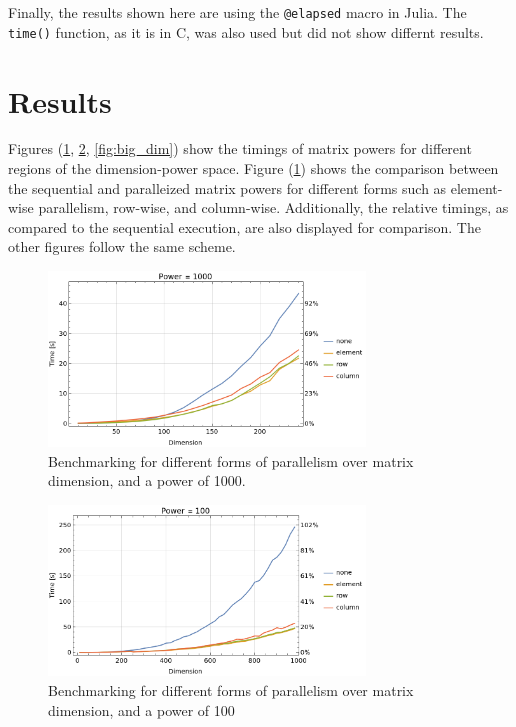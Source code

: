 \documentclass{article}
\begin{document}
    Finally, the results shown here are using the \verb|@elapsed| macro in Julia.  The \verb|time()| function, as it is in C, was also used but did not show differnt results.

\section{Results}

    Figures (\ref{fig:small_dim}, \ref{fig:med_dim}, \ref{fig:big_dim}) show the timings of matrix powers for different regions of the dimension-power space.  Figure (\ref{fig:small_dim}) shows the comparison between the sequential and paralleized matrix powers for different forms such as element-wise parallelism, row-wise, and column-wise.  Additionally, the relative timings, as compared to the sequential execution, are also displayed for comparison.  The other figures follow the same scheme.

    \begin{figure}[h]
        \centering
        \includegraphics[width=0.75\textwidth]{images/dimension_small.png}
        \caption{Benchmarking for different forms of parallelism over matrix dimension, and a power of 1000.}
        \label{fig:small_dim}
    \end{figure}

    \begin{figure}[h!]
        \centering
        \includegraphics[width=0.75\textwidth]{images/dimension.png}
        \caption{Benchmarking for different forms of parallelism over matrix dimension, and a power of 100}
        \label{fig:med_dim}
    \end{figure}
\end{document}
